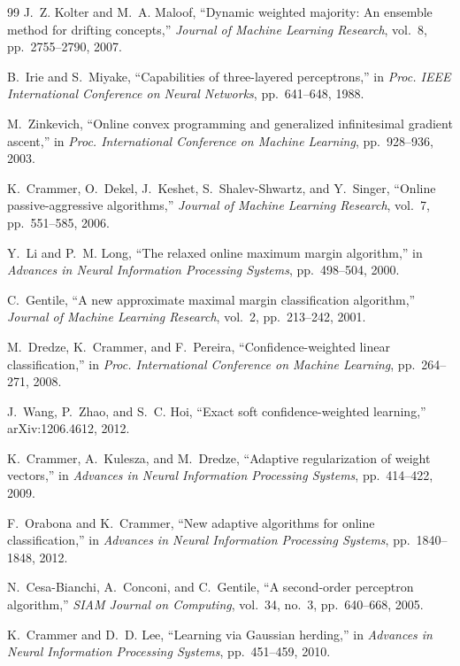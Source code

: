 ﻿\documentclass[12pt,a4paper]{article}
\begin{document}
\begin{thebibliography}{99}
J.~Z. Kolter and M.~A. Maloof, ``Dynamic weighted majority: An ensemble method for drifting concepts,'' \emph{Journal of Machine Learning Research}, vol.~8, pp.~2755--2790, 2007.

B.~Irie and S.~Miyake, ``Capabilities of three-layered perceptrons,'' in \emph{Proc. IEEE International Conference on Neural Networks}, pp.~641--648, 1988.

M.~Zinkevich, ``Online convex programming and generalized infinitesimal gradient ascent,'' in \emph{Proc. International Conference on Machine Learning}, pp.~928--936, 2003.

K.~Crammer, O.~Dekel, J.~Keshet, S.~Shalev-Shwartz, and Y.~Singer, ``Online passive-aggressive algorithms,'' \emph{Journal of Machine Learning Research}, vol.~7, pp.~551--585, 2006.

Y.~Li and P.~M. Long, ``The relaxed online maximum margin algorithm,'' in \emph{Advances in Neural Information Processing Systems}, pp.~498--504, 2000.

C.~Gentile, ``A new approximate maximal margin classification algorithm,'' \emph{Journal of Machine Learning Research}, vol.~2, pp.~213--242, 2001.

M.~Dredze, K.~Crammer, and F.~Pereira, ``Confidence-weighted linear classification,'' in \emph{Proc. International Conference on Machine Learning}, pp.~264--271, 2008.

J.~Wang, P.~Zhao, and S.~C. Hoi, ``Exact soft confidence-weighted learning,'' arXiv:1206.4612, 2012.

K.~Crammer, A.~Kulesza, and M.~Dredze, ``Adaptive regularization of weight vectors,'' in \emph{Advances in Neural Information Processing Systems}, pp.~414--422, 2009.

F.~Orabona and K.~Crammer, ``New adaptive algorithms for online classification,'' in \emph{Advances in Neural Information Processing Systems}, pp.~1840--1848, 2012.

N.~Cesa-Bianchi, A.~Conconi, and C.~Gentile, ``A second-order perceptron algorithm,'' \emph{SIAM Journal on Computing}, vol.~34, no.~3, pp.~640--668, 2005.

K.~Crammer and D.~D. Lee, ``Learning via Gaussian herding,'' in \emph{Advances in Neural Information Processing Systems}, pp.~451--459, 2010.


\end{thebibliography}
\end{document}
